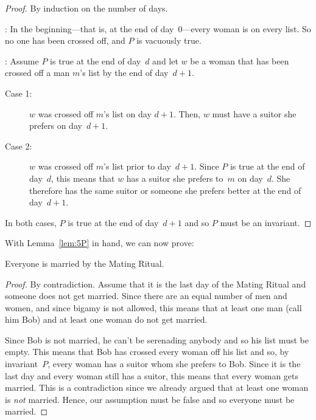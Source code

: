 \begin{proof}
By induction on the number of days.

: In the beginning---that is, at the end of
day~0---every woman is on every list.  So no one has been crossed off, and
$P$ is vacuously true.

: Assume $P$ is true at the end of
day~$d$ and let $w$ be a woman that has been crossed off a man $m$'s
list by the end of day~$d + 1$.

\begin{description}

\item[Case 1:]
$w$ was crossed off $m$'s list on day $d + 1$.  Then, $w$ must have a
  suitor she prefers on day~$d+1$.

\item[Case 2:]
$w$ was crossed off $m$'s list prior to day~$d+1$.  Since $P$ is true
  at the end of day~$d$, this means that $w$ has a suitor she prefers
  to~$m$ on day~$d$.  She therefore has the same suitor or someone she
  prefers better at the end of day~$d + 1$.

\end{description}
In both cases, $P$ is true at the end of day~$d + 1$ and so $P$ must
be an invariant.
\end{proof}

With Lemma~\ref{lem:5P} in hand, we can now prove:

\begin{theorem}
Everyone is married by the Mating Ritual.
\end{theorem}

\begin{proof}
By contradiction. Assume that it is the last day of the Mating Ritual
and someone does not get married.  Since there are an equal number of
men and women, and since bigamy is not allowed, this means that at
least one man (call him Bob) and at least one woman do not get
married.

Since Bob is not married, he can't be serenading anybody and so his
list must be empty.  This means that Bob has crossed every woman off
his list and so, by invariant~$P$, every woman has a suitor whom she
prefers to Bob.  Since it is the last day and every woman still has a
suitor, this means that every woman gets married.  This is a
contradiction since we already argued that at least one woman is
\emph{not} married.  Hence, our assumption must be false and so
everyone must be married.
\end{proof}

